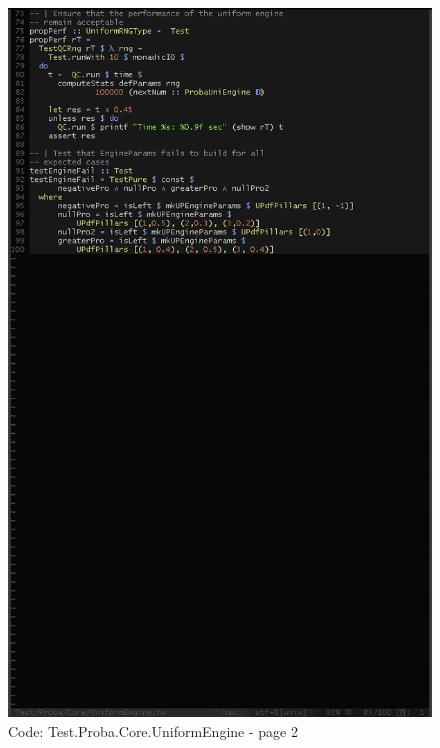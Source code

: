 \documentclass[12pt,a4paper,titlepage]{article}
\begin{document}
\begin{figure}[h!]
\centering
\includegraphics[width=1\textwidth]{img/code-test-uni-2.png}
\caption{Code: Test.Proba.Core.UniformEngine - page 2}
\label{fig:test.u2}
\end{figure}
\end{document}
